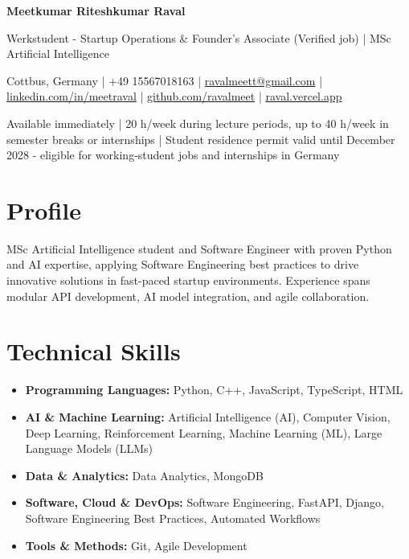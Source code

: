 \documentclass[a4paper,10pt]{article}
\begin{document}
\begin{center}
  {\LARGE\bfseries Meetkumar Riteshkumar Raval}\par\vspace{3pt}
  {\large Werkstudent - Startup Operations \& Founder's Associate (Verified job) | MSc Artificial Intelligence}\par\vspace{3pt}
  {\small Cottbus, Germany | +49 15567018163 | \href{mailto:ravalmeett@gmail.com}{ravalmeett@gmail.com} | \href{https://www.linkedin.com/in/meetraval/}{linkedin.com/in/meetraval} | \href{https://github.com/ravalmeet}{github.com/ravalmeet} | \href{https://raval.vercel.app/}{raval.vercel.app}}\par\vspace{2pt}
  {\small Available immediately | 20 h/week during lecture periods, up to 40 h/week in semester breaks or internships | Student residence permit valid until December 2028 - eligible for working-student jobs and internships in Germany}\par
\end{center}

\section*{Profile}
MSc Artificial Intelligence student and Software Engineer with proven Python and AI expertise, applying Software Engineering best practices to drive innovative solutions in fast-paced startup environments. Experience spans modular API development, AI model integration, and agile collaboration.\par

\section*{Technical Skills}
\begin{itemize}
\item \textbf{Programming Languages:} Python, C++, JavaScript, TypeScript, HTML
\item \textbf{AI \& Machine Learning:} Artificial Intelligence (AI), Computer Vision, Deep Learning, Reinforcement Learning, Machine Learning (ML), Large Language Models (LLMs)
\item \textbf{Data \& Analytics:} Data Analytics, MongoDB
\item \textbf{Software, Cloud \& DevOps:} Software Engineering, FastAPI, Django, Software Engineering Best Practices, Automated Workflows
\item \textbf{Tools \& Methods:} Git, Agile Development
\end{itemize}
\end{document}
